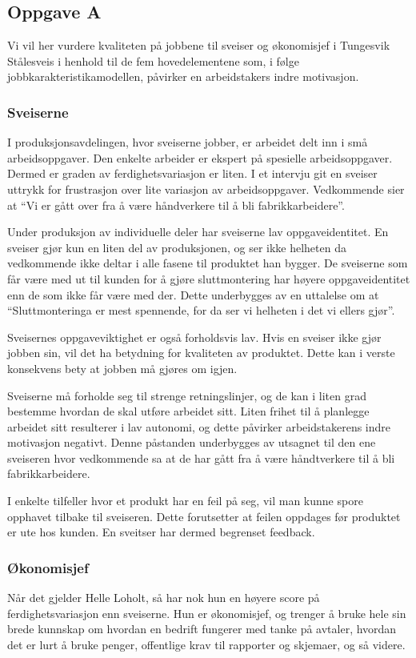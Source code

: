 

\subsection{Oppgave A}
Vi vil her vurdere kvaliteten på jobbene til sveiser og økonomisjef i Tungesvik Stålesveis i henhold til de fem hovedelementene som, i følge jobbkarakteristikamodellen, påvirker en arbeidstakers indre motivasjon.

\subsubsection{Sveiserne}
I produksjonsavdelingen, hvor sveiserne jobber, er arbeidet delt inn i små arbeidsoppgaver.
Den enkelte arbeider er ekspert på spesielle arbeidsoppgaver.
Dermed er graden av ferdighetsvariasjon er liten.
I et intervju git en sveiser uttrykk for frustrasjon over lite variasjon av arbeidsoppgaver.
Vedkommende sier at “Vi er gått over fra å være håndverkere til å bli fabrikkarbeidere”.

Under produksjon av individuelle deler har sveiserne lav oppgaveidentitet.
En sveiser gjør kun en liten del av produksjonen, og ser ikke helheten da vedkommende ikke deltar i alle fasene til produktet han bygger.
De sveiserne som får være med ut til kunden for å gjøre sluttmontering har høyere oppgaveidentitet enn de som ikke får være med der.
Dette underbygges av en uttalelse om at “Sluttmonteringa er mest spennende, for da ser vi helheten i det vi ellers gjør”.

Sveisernes oppgaveviktighet er også forholdsvis lav.
Hvis en sveiser ikke gjør jobben sin, vil det ha betydning for kvaliteten av produktet.
Dette kan i verste konsekvens bety at jobben må gjøres om igjen.

Sveiserne må forholde seg til strenge retningslinjer, og de kan i liten grad bestemme hvordan de skal utføre arbeidet sitt.
Liten frihet til å planlegge arbeidet sitt resulterer i lav autonomi, og dette påvirker arbeidstakerens indre motivasjon negativt.
Denne påstanden underbygges av utsagnet til den ene sveiseren hvor vedkommende sa at de har gått fra å være håndtverkere til å bli fabrikkarbeidere.

I enkelte tilfeller hvor et produkt har en feil på seg, vil man kunne spore opphavet tilbake til sveiseren.
Dette forutsetter at feilen oppdages før produktet er ute hos kunden.
En sveitser har dermed begrenset feedback.

\subsubsection{Økonomisjef}
Når det gjelder Helle Loholt, så har nok hun en høyere score på ferdighetsvariasjon enn sveiserne. Hun er økonomisjef, og trenger å bruke hele sin brede kunnskap om hvordan en bedrift fungerer med tanke på avtaler, hvordan det er lurt å bruke penger, offentlige krav til rapporter og skjemaer, og så videre.

